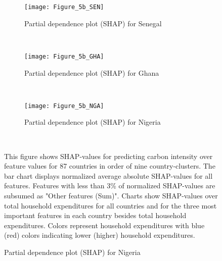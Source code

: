 \begin{figure}[ht!]\ContinuedFloat
    \centering
   \begin{subfigure}[b]{\textwidth}
         \centering
         \caption{Partial dependence plot (SHAP) for Senegal}
         \label{fig:5b_SEN}
         \texttt{[image: Figure\_5b\_SEN]}         
     \end{subfigure}
    \\
    \vspace{0.5cm}
   \begin{subfigure}[b]{\textwidth}
         \centering
         \caption{Partial dependence plot (SHAP) for Ghana}
         \label{fig:5b_GHA}
         \texttt{[image: Figure\_5b\_GHA]}         
     \end{subfigure}
    \\
    \vspace{0.5cm}
   \begin{subfigure}[b]{\textwidth}
         \centering
         \caption{Partial dependence plot (SHAP) for Nigeria}
         \label{fig:5b_NGA}
         \texttt{[image: Figure\_5b\_NGA]}
    \end{subfigure}
    \\
    \vspace{0.5cm}
    \begin{subcaption2}
     This figure shows SHAP-values for predicting carbon intensity over feature values for 87 countries in order of nine country-clusters. The bar chart displays normalized average absolute SHAP-values for all features. Features with less than 3\% of normalized SHAP-values are subsumed as "Other features (Sum)". Charts show SHAP-values over total household expenditures for all countries and for the three most important features in each country besides total household expenditures. Colors represent household expenditures with blue (red) colors indicating lower (higher) household expenditures.
     \end{subcaption2}
\end{figure}

